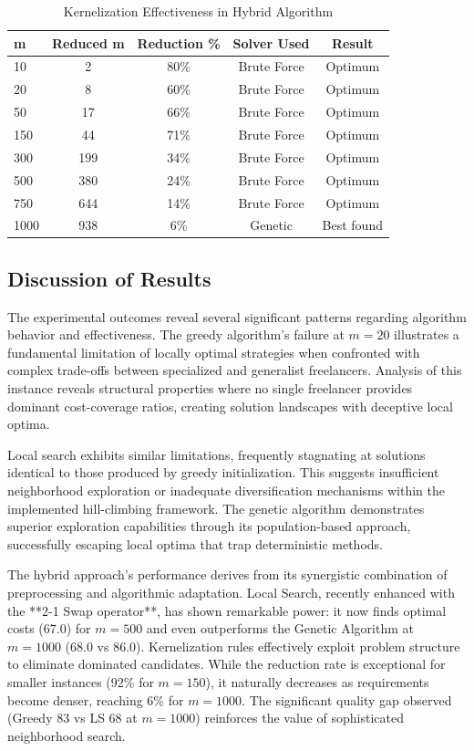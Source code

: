 \documentclass[12pt,a4paper]{article}
\begin{document}
\begin{table}[H]
	\centering
	\caption{Kernelization Effectiveness in Hybrid Algorithm}
	\label{tab:kernel-breakdown}
	\begin{tabular}{@{}lcccc@{}}
		\toprule
		\textbf{m} & \textbf{Reduced m} & \textbf{Reduction \%} & \textbf{Solver Used} & \textbf{Result} \\
		\midrule
		10 & 2 & 80\% & Brute Force & Optimum \\
		20 & 8 & 60\% & Brute Force & Optimum \\
		50 & 17 & 66\% & Brute Force & Optimum \\
		150 & 44 & 71\% & Brute Force & Optimum \\
		300 & 199 & 34\% & Brute Force & Optimum \\
		500 & 380 & 24\% & Brute Force & Optimum \\
		750 & 644 & 14\% & Brute Force & Optimum \\
		1000 & 938 & 6\% & Genetic & Best found \\
		\bottomrule
	\end{tabular}
\end{table}

\subsection{Discussion of Results}
\label{subsec:discussion}

The experimental outcomes reveal several significant patterns regarding algorithm behavior and effectiveness. The greedy algorithm's failure at $m=20$ illustrates a fundamental limitation of locally optimal strategies when confronted with complex trade-offs between specialized and generalist freelancers. Analysis of this instance reveals structural properties where no single freelancer provides dominant cost-coverage ratios, creating solution landscapes with deceptive local optima.

Local search exhibits similar limitations, frequently stagnating at solutions identical to those produced by greedy initialization. This suggests insufficient neighborhood exploration or inadequate diversification mechanisms within the implemented hill-climbing framework. The genetic algorithm demonstrates superior exploration capabilities through its population-based approach, successfully escaping local optima that trap deterministic methods.

The hybrid approach's performance derives from its synergistic combination of preprocessing and algorithmic adaptation. Local Search, recently enhanced with the **2-1 Swap operator**, has shown remarkable power: it now finds optimal costs (67.0) for $m=500$ and even outperforms the Genetic Algorithm at $m=1000$ (68.0 vs 86.0). Kernelization rules effectively exploit problem structure to eliminate dominated candidates. While the reduction rate is exceptional for smaller instances (92\% for $m=150$), it naturally decreases as requirements become denser, reaching 6\% for $m=1000$. The significant quality gap observed (Greedy 83 vs LS 68 at $m=1000$) reinforces the value of sophisticated neighborhood search.
\end{document}
